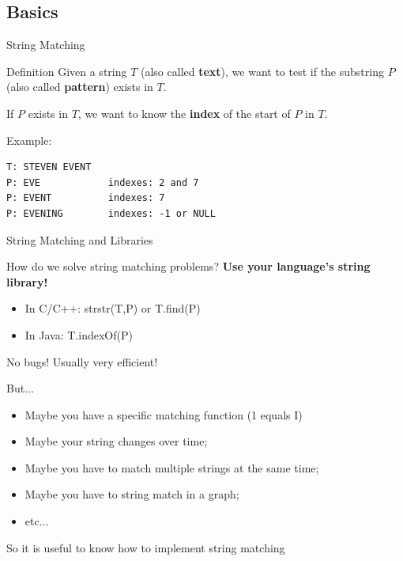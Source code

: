 \subsection{Basics}

\begin{frame}[fragile]{String Matching}
  \begin{block}{Definition}
    Given a string $T$ (also called {\bf text}), we want to test if the substring $P$ (also called {\bf pattern}) exists in $T$.
    \bigskip

    If $P$ exists in $T$, we want to know the {\bf index} of the start of $P$ in $T$.
  \end{block}\bigskip

  Example:
\begin{verbatim}
T: STEVEN EVENT
P: EVE            indexes: 2 and 7
P: EVENT          indexes: 7
P: EVENING        indexes: -1 or NULL
\end{verbatim}
\end{frame}

\begin{frame}{String Matching and Libraries}

  \begin{block}{How do we solve string matching problems?}
    {\bf Use your language's string library!}
    \begin{itemize}
      \item In C/C++: strstr(T,P) or T.find(P)
      \item In Java: T.indexOf(P)
    \end{itemize}\bigskip

    No bugs! Usually very efficient!
  \end{block}\bigskip

  But...
  \begin{itemize}
    \item Maybe you have a specific matching function (1 equals I)
    \item Maybe your string changes over time;
    \item Maybe you have to match multiple strings at the same time;
    \item Maybe you have to string match in a graph;
    \item etc...
  \end{itemize}\bigskip

  So it is useful to know how to implement string matching
\end{frame}

